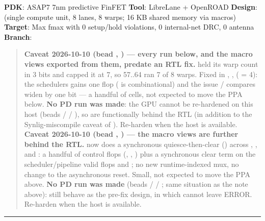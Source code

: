 \begin{record}

\textbf{PDK}: ASAP7 7nm predictive FinFET \textbf{Tool}: LibreLane +
OpenROAD \textbf{Design}:  (single compute unit, 8 lanes,
8 warps; 16 KB shared memory via  macros)
\textbf{Target}: Max fmax with 0 setup/\allowbreak{}hold violations, 0
internal-net DRC, 0 antenna \textbf{Branch}: 

\begin{quote}
\textbf{Caveat 2026-10-10 (bead , ) --- every run
below, and the macro views exported from them, predate an RTL fix.}
 held its warp count in 3 bits and capped it at 7, so
 57..64 ran 7 of 8 warps. Fixed in
, , 
( = 4): the scheduler\textquotesingle s
 gains one flop ( is combinational) and
the issue /  compares widen by one bit --- a handful of
cells, not expected to move the PPA below. \textbf{No PD run was made}:
the GPU cannot be re-hardened on this host (beads  /
 / ), so  are
functionally behind the RTL (in addition to the Synlig-miscompile caveat
of ). Re-harden when the host is available. \textbf{Caveat
2026-10-10 (bead , ) --- the macro views are further
behind the RTL.}  now does a synchronous
quiesce-then-clear () across ,
,  and
: a handful of control flops (,
, ) plus a synchronous clear term on the
scheduler/\allowbreak{}pipeline valid flops and ; no
new runtime-indexed mux, no change to the asynchronous reset. Small, not
expected to move the PPA above. \textbf{No PD run was made} (beads
 /  / ; same situation as the 
note above):  still behave as the
pre-fix design, in which  cannot leave ERROR. Re-harden
when the host is available.
\end{quote}

\begin{center}\rule{0.5\linewidth}{0.5pt}\end{center}

\end{record}

